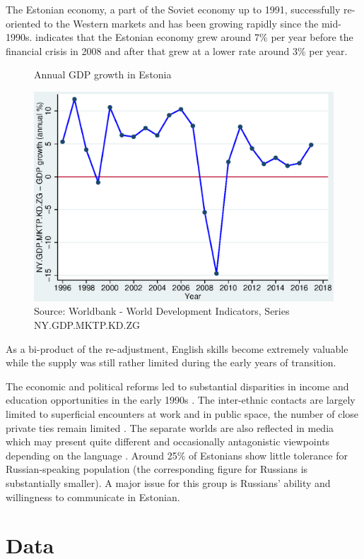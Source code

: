 \documentclass[12pt, a4paper]{article}
\begin{document}
The Estonian economy, a part of the Soviet economy up to 1991, successfully
re-oriented to the Western markets and has been growing rapidly since
the mid-1990s.   indicates that the Estonian economy grew around 7\% per year before the financial crisis in 2008 and after that grew at a lower rate around 3\% per year.
\begin{figure}[h]
	\centering
	\caption{Annual GDP growth in Estonia}\label{fig:gdp_growth}
	\includegraphics[width=0.6\linewidth]{gdp_growth_per_year.eps}
	\caption*{Source: Worldbank - World Development Indicators, Series  NY.GDP.MKTP.KD.ZG}
\end{figure}
  As
a bi-product of the re-adjustment, English skills become extremely
valuable while the supply was still rather limited during the early
years of transition.

The economic and political reforms led to substantial
disparities in income and education opportunities
in the early 1990s \citep{Leping2008,
	lindemann+saar2011Russian2ndGeneration}.  The inter-ethnic contacts
are largely limited to superficial encounters at work and in public
space, the number of close private ties remain limited
\citep{korts2009JofBaltStud}.  The
separate worlds are also reflected in media which may present quite
different and occasionally antagonistic viewpoints depending on the
language \citep{Korts2002}.  Around 25\% of Estonians show little
tolerance for Russian-speaking population (the corresponding figure
for Russians is substantially smaller).  A major issue for this group
is Russians' ability and willingness to communicate in Estonian.


\section{Data}
\label{subsec:ss_var}
\end{document}
